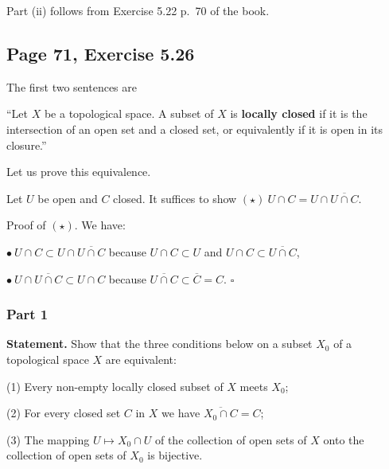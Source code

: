\documentclass[parskip=half,fontsize=12pt]{scrartcl}%
\begin{document}
Part (ii) %
follows from Exercise 5.22 p.~70 of the book.

\subsection{Page 71, Exercise 5.26}%

The first two sentences are

``Let $X$ be a topological space. A subset of $X$ is \textbf{locally closed} if it is the intersection of an open set and a closed set, or equivalently if it is open in its closure.'' 

Let us prove this equivalence.

Let $U$ be open and $C$ closed. It suffices to show $(\star)\ U\cap C=U\cap\overline{U\cap C}$. 

Proof of $(\star)$. We have:

$\bullet\ U\cap C\subset U\cap\overline{U\cap C}$ because $U\cap C\subset U$ and $U\cap C\subset\overline{U\cap C}$,

$\bullet\ U\cap\overline{U\cap C}\subset U\cap C$ because $\overline{U\cap C}\subset\overline C=C$. $\square$ %

\subsubsection{Part 1}

\textbf{Statement.} Show that the three conditions below on a subset $X_0$ of a topological space $X$ are equivalent:

(1) Every non-empty locally closed subset of $X$ meets $X_0$;

(2) For every closed set $C$ in $X$ we have $\overline{X_0\cap C}=C$;

(3) The mapping $U\mapsto X_0\cap U$ of the collection of open sets of $X$ onto the collection of open sets of $X_0$ is bijective.
\end{document}
